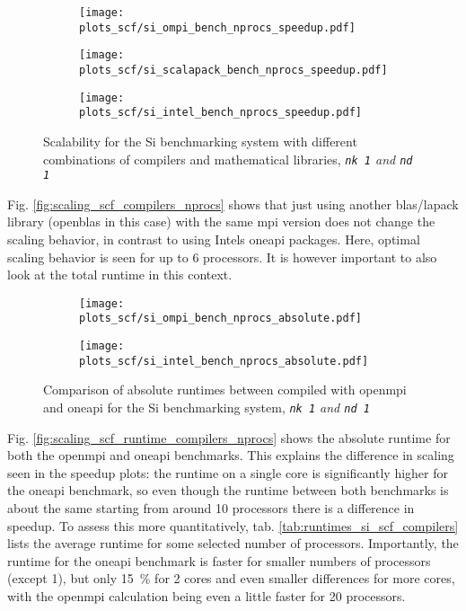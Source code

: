 \documentclass[main.tex]{subfiles}
\begin{document}
\begin{figure}[ht!]
\begin{subfigure}[b]{0.49\textwidth}
    \centering
    \texttt{[image: plots\_scf/si\_ompi\_bench\_nprocs\_speedup.pdf]}
\end{subfigure}
\begin{subfigure}[b]{0.49\textwidth}
    \centering
    \texttt{[image: plots\_scf/si\_scalapack\_bench\_nprocs\_speedup.pdf]}
\end{subfigure}
\begin{subfigure}[b]{0.49\textwidth}
    \centering
    \texttt{[image: plots\_scf/si\_intel\_bench\_nprocs\_speedup.pdf]}
\end{subfigure}
\caption{Scalability for the Si benchmarking system with different combinations of compilers and mathematical libraries, \emph{\texttt{nk 1} and \texttt{nd 1}}}
\label{fig:scaling_scf_compilers_si}
\end{figure}

Fig. \ref{fig:scaling_scf_compilers_nprocs} shows that just using another \gls{blas}/\gls{lapack} library (\gls{openblas} in this case) with the same \gls{mpi} version does not change the scaling behavior, in contrast to using Intels \gls{oneapi} packages.
Here, optimal scaling behavior is seen for up to 6 processors.
It is however important to also look at the total runtime in this context.

\begin{figure}[ht!]
\begin{subfigure}[b]{0.49\textwidth}
    \centering
    \texttt{[image: plots\_scf/si\_ompi\_bench\_nprocs\_absolute.pdf]}
\end{subfigure}
\begin{subfigure}[b]{0.49\textwidth}
    \centering
    \texttt{[image: plots\_scf/si\_intel\_bench\_nprocs\_absolute.pdf]}
\end{subfigure}
\caption{Comparison of absolute runtimes between \QE compiled with \gls{openmpi} and \gls{oneapi} for the Si benchmarking system, \emph{\texttt{nk 1} and \texttt{nd 1}}}
\label{fig:scaling_scf_compilers_runtime_si}
\end{figure}
Fig. \ref{fig:scaling_scf_runtime_compilers_nprocs} shows the absolute runtime for both the \gls{openmpi} and \gls{oneapi} benchmarks.
This explains the difference in scaling seen in the speedup plots: the runtime on a single core is significantly higher for the \gls{oneapi} benchmark, so even though the runtime between both benchmarks is about the same starting from around 10 processors there is a difference in speedup.
To assess this more quantitatively, tab. \ref{tab:runtimes_si_scf_compilers} lists the average runtime for some selected number of processors.
Importantly, the runtime for the \gls{oneapi} benchmark is faster for smaller numbers of processors (except 1), but only \SI{15}{\percent} for 2 cores and even smaller differences for more cores, with the \gls{openmpi} calculation being even a little faster for 20 processors.
\end{document}
